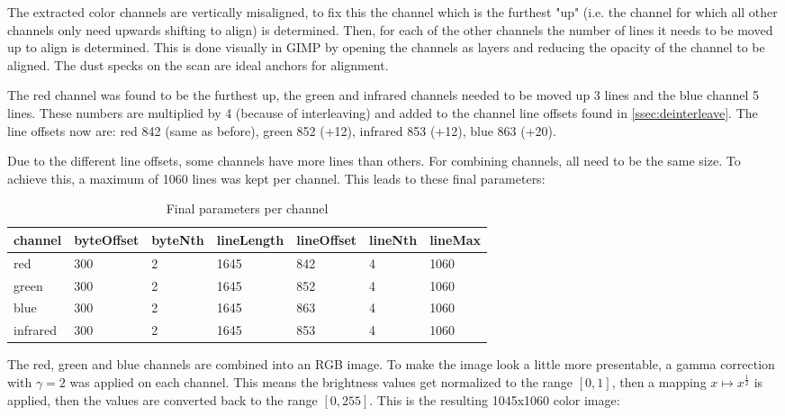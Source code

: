 \documentclass{article}
\begin{document}
The extracted color channels are vertically misaligned, to fix this the
channel which is the furthest "up" (i.e. the channel for which all other channels only need
upwards shifting to align) is determined. Then, for each of the other channels the number
of lines it needs to be moved up to align is determined. This is done visually in GIMP by
opening the channels as layers and reducing the opacity of the channel to be aligned.
The dust specks on the scan are ideal anchors for alignment.

The red channel was found to be the furthest up, the green and infrared channels
needed to be moved up 3 lines and the blue channel 5 lines.
These numbers are multiplied by 4
(because of interleaving) and added to the channel line offsets found in \autoref{ssec:deinterleave}.
The line offsets now are: red 842 (same as before), green 852 (+12), infrared 853 (+12), blue 863 (+20).

Due to the different line offsets, some channels have more lines than others.
For combining channels, all need to be the same size. To achieve this, a maximum
of 1060 lines was kept per channel. This leads to these final parameters:

\begin{table}[H]
  \caption{Final parameters per channel}
  \centering
  \begin{tabular}{l|l|l|l|l|l|l}
    channel & byteOffset & byteNth & lineLength & lineOffset & lineNth & lineMax \\ \hline
    red & 300 & 2 & 1645 & 842 & 4 & 1060 \\
    green & 300 & 2 & 1645 & 852 & 4 & 1060 \\
    blue & 300 & 2 & 1645 & 863 & 4 & 1060 \\
    infrared & 300 & 2 & 1645 & 853 & 4 & 1060 \\
  \end{tabular}
\end{table}

The red, green and blue channels are combined into an RGB image. To make the image look a little
more presentable, a gamma correction with $\gamma = 2$ was applied on each channel.
This means the brightness values get normalized to the range $[0, 1]$,
then a mapping $x \mapsto x^{\frac{1}{2}}$ is applied, then the values are
converted back to the range $[0, 255]$. This is the resulting 1045x1060 color image:
\end{document}

